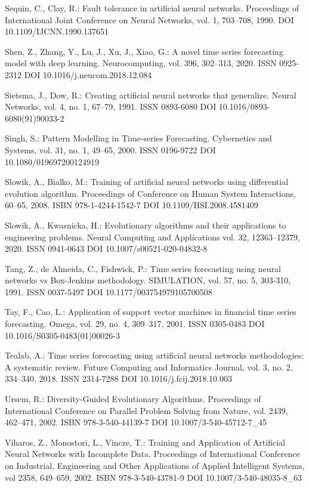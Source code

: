 \begin{thebibliography}{99.}
 Sequin, C., Clay, R.: Fault tolerance in artificial neural networks. Proceedings of International Joint Conference on Neural Networks, vol. 1, 703--708, 1990. DOI 10.1109/IJCNN.1990.137651

 Shen, Z., Zhang, Y., Lu, J., Xu, J., Xiao, G.: A novel time series forecasting model with deep learning. Neurocomputing, vol. 396, 302--313, 2020. ISSN 0925-2312 DOI 10.1016/j.neucom.2018.12.084

 Sietsma, J., Dow, R.: Creating artificial neural networks that generalize. Neural Networks, vol. 4, no. 1, 67--79, 1991. ISSN 0893-6080 DOI 10.1016/0893-6080(91)90033-2

 Singh, S.: Pattern Modelling in Time-series Forecasting. Cybernetics and Systems, vol. 31, no. 1, 49--65, 2000. ISSN 0196-9722 DOI 10.1080/019697200124919

 Slowik, A., Bialko, M.: Training of artificial neural networks using differential evolution algorithm. Proceedings of Conference on Human System Interactions, 60--65, 2008. ISBN 978-1-4244-1542-7 DOI 10.1109/HSI.2008.4581409

 Slowik, A., Kwasnicka, H.: Evolutionary algorithms and their applications to engineering problems. Neural Computing and Applications vol. 32, 12363--12379, 2020. ISSN 0941-0643 DOI 10.1007/s00521-020-04832-8

 Tang, Z., de Almeida, C., Fishwick, P.: Time series forecasting using neural networks vs Box-Jenkins methodology. SIMULATION, vol. 57, no. 5, 303-310, 1991. ISSN 0037-5497 DOI 10.1177/003754979105700508

 Tay, F., Cao, L.: Application of support vector machines in financial time series forecasting. Omega, vol. 29, no. 4, 309--317, 2001. ISSN 0305-0483 DOI 10.1016/S0305-0483(01)00026-3

 Tealab, A.: Time series forecasting using artificial neural networks methodologies: A systematic review. Future Computing and Informatics Journal, vol. 3, no. 2, 334--340, 2018. ISSN 2314-7288 DOI 10.1016/j.fcij.2018.10.003

 Ursem, R.: Diversity-Guided Evolutionary Algorithms. Proceedings of International Conference on Parallel Problem Solving from Nature, vol. 2439, 462--471, 2002. ISBN 978-3-540-44139-7 DOI 10.1007/3-540-45712-7\_45

 Viharos, Z., Monostori, L., Vincze, T.: Training and Application of Artificial Neural Networks with Incomplete Data. Proceedings of International Conference on Industrial, Engineering and Other Applications of Applied Intelligent Systems, vol 2358, 649--659, 2002. ISBN 978-3-540-43781-9 DOI 10.1007/3-540-48035-8\_63


\end{thebibliography}
